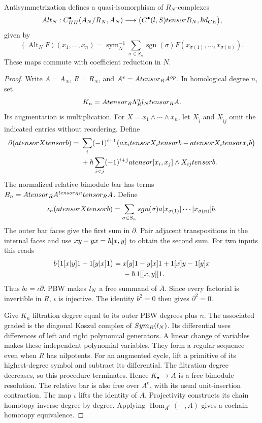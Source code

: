 \begin{theorem}\label{thm:vol2-relative-rees}
Antisymmetrization defines a quasi-isomorphism of $R_N$-complexes
\[
 Alt_N:
 C^\bullet_{HH}(A_N/R_N,A_N)
 \longrightarrow
 \bigl(C^\bullet(l,S)tensor R_N,\hbar d_{CE}\bigr),
\]
given by
\[
 (\operatorname{Alt}_NF)(x_1,\ldots,x_n)
 =\operatorname{sym}_N^{-1}
 \sum_{\sigma\in S_n}\operatorname{sgn}(\sigma)
 F(x_{\sigma(1)},\ldots,x_{\sigma(n)}).
\]
These maps commute with coefficient reduction in $N$.
\end{theorem}
\begin{proof}
Write $A=A_N$, $R=R_N$, and $A^e=Atensor_R A^{op}$.
In homological degree $n$, set
\[
 K_n=Atensor_R\Lambda_R^nl_Ntensor_R A.
\]
Its augmentation is multiplication.
For $X=x_1\wedge\cdots\wedge x_n$, let $X_{\widehat i}$ and
$X_{\widehat i\widehat j}$ omit the indicated entries without reordering.
Define
\[
\begin{split}
 \partial(atensor Xtensor b)
 ={}&\sum_i(-1)^{i+1}
 \bigl(ax_itensor X_{i}tensor b
       -atensor X_{i}tensor x_i b\bigr)\\
 &+\hbar\sum_{i<j}(-1)^{i+j}
 atensor[x_i,x_j]\wedge X_{ij}tensor b.
\end{split}
\]
The normalized relative bimodule bar has terms
$B_n=Atensor_RA^{tensor_R n}tensor_R A$.
Define
\[
 \iota_n(atensor Xtensor b)
 =\sum_{\sigma\in S_n}sgn(\sigma)
       a[x_{\sigma(1)}|\cdots|x_{\sigma(n)}]b.
\]
The outer bar faces give the first sum in $\partial$.
Pair adjacent transpositions in the internal faces and use
$xy-yx=\hbar[x,y]$ to obtain the second sum.
For two inputs this reads
\[
\begin{split}
 b\bigl(1[x|y]1-1[y|x]1\bigr)
 ={}&x[y]1-y[x]1+1[x]y-1[y]x\\
 &-\hbar\,1[[x,y]]1.
\end{split}
\]
Thus $b\iota=\iota\partial$.
PBW makes $l_N$ a free summand of $\bar A$.
Since every factorial is invertible in $R$, $\iota$ is injective.
The identity $b^2=0$ then gives $\partial^2=0$.

Give $K_n$ filtration degree equal to its outer PBW degrees plus $n$.
The associated graded is the diagonal Koszul complex of
$Sym_R(l_N)$.
Its differential uses differences of left and right polynomial generators.
A linear change of variables makes these independent polynomial variables.
They form a regular sequence even when $R$ has nilpotents.
For an augmented cycle, lift a primitive of its highest-degree symbol
and subtract its differential.
The filtration degree decreases, so this procedure terminates.
Hence $K_\bullet\to A$ is a free bimodule resolution.
The relative bar is also free over $A^e$, with its usual unit-insertion contraction.
The map $\iota$ lifts the identity of $A$.
Projectivity constructs its chain homotopy inverse degree by degree.
Applying $\operatorname{Hom}_{A^e}(-,A)$ gives a cochain homotopy equivalence.


\end{proof}
